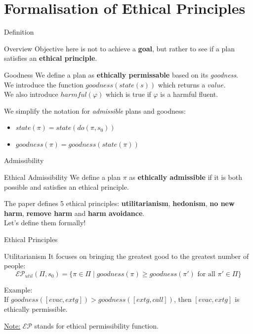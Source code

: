 \documentclass[compress,xcolor=table]{beamer}
\begin{document}
\section{Formalisation of Ethical Principles}

\begin{frame}{Definition}
    \begin{alertblock}{Overview}
        Objective here is not to achieve a \textbf{goal}, but rather to see 
        if a plan satisfies an \textbf{ethical principle}. \\
    \end{alertblock}
    \pause
    \begin{block}{Goodness}
        We define a plan as \textbf{ethically permissable} based on its \textit{goodness}.\\
        We introduce the function $goodness(state(s))$ which returns a $value$.\\
        We also introduce $harmful(\varphi)$ which is true if $\varphi$ is a harmful fluent.\\
    \end{block}
    \pause
    We simplify the notation for \textit{admissible} plans and goodness:
    \begin{itemize}
        \item $state(\pi) = state(do(\pi, s_0))$
        \item $goodness(\pi) = goodness(state(\pi))$
    \end{itemize}
\end{frame}

\begin{frame}{Admissibility}
    \begin{alertblock}{Ethical Admissibility}
        We define a plan $\pi$ as \textbf{ethically admissible} if it is both possible 
        and satisfies an ethical principle.
    \end{alertblock}
    The paper defines 5 ethical principles: \textbf{utilitarianism}, \textbf{hedonism}, \textbf{no new harm}, \textbf{remove harm} and \textbf{harm avoidance}.\\
    Let's define them formally!
\end{frame}

\begin{frame}{Ethical Principles}
    \small
    \begin{block}{Utilitarianism}
        It focuses on bringing the greatest good to the greatest number of people:
        $$
        \mathcal{E}\mathcal{P}_{util}(\Pi, s_0) =
        \{ \pi \in \Pi \mid goodness(\pi) \geq goodness(\pi')
        \text{ for all } \pi' \in \Pi \}
        $$
    \end{block}
    \pause
    Example: \\
    If $goodness([evac,extg])>goodness([extg,call])$, then $[evac,extg]$ is  ethically permissible.

    \tiny
    \underline{Note:} $\mathcal{E}\mathcal{P}$ stands for ethical permissibility function.

\end{frame}
\end{document}
